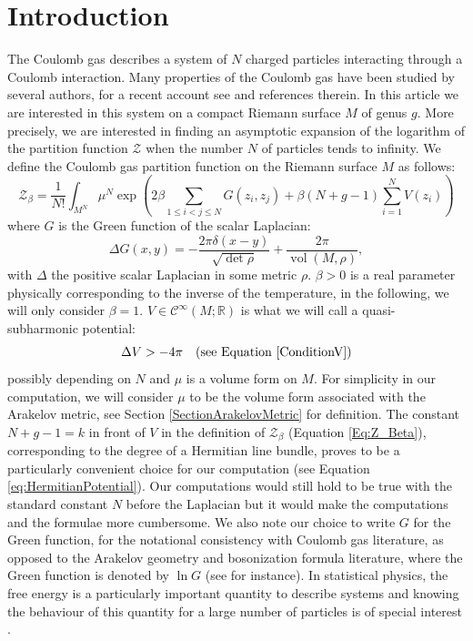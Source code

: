 \documentclass{article}
\theoremstyle{definition}
\theoremstyle{remark}
\DeclareMathOperator{\vol}{vol}
\begin{document}
\section{Introduction}
The Coulomb gas describes a system of $N$ charged particles interacting through a Coulomb interaction. Many properties of the Coulomb gas have been studied by several authors, for a recent account see \cite{serfaty2024lecturescoulombrieszgases,Ginibre} and references therein. In this article we are interested in this system on a compact Riemann surface $M$ of genus $g$. More precisely, we are interested in finding an asymptotic expansion of the logarithm of the partition function $\mathcal{Z}$ when the number $N$ of particles tends to infinity. We define the Coulomb gas partition function on the Riemann surface $M$ as follows: 
\begin{equation}\label{Eq:Z_Beta}
\mathcal{Z}_{\beta}=\frac{1}{N!}\int_{M^{N}}\mu^{N}\exp\left(2\beta\sum_{1\leq i<j\leq N} G(z_{i},z_{j})+\beta(N+g-1)\sum_{i=1}^{N} V(z_{i})\right)
\end{equation}where $G$ is the Green function of the scalar Laplacian: $$\Delta G(x,y)=-\frac{2\pi\delta(x-y)}{\sqrt{\det \rho}}+\frac{2\pi}{\vol(M,\rho)},  $$ with $\Delta$ the positive scalar Laplacian in some metric $\rho.$ $\beta >0$ is a real parameter physically corresponding to the inverse of the temperature, in the following, we will only consider $\beta=1.$ $V \in \mathcal{C}^{\infty}(M;\mathbb{R})$ is what we will call a quasi-subharmonic potential: $$\Delta V>-4\pi  ~~\text{ (see Equation \eqref{ConditionV})}$$ possibly depending on $N$ and $\mu$ is a volume form on $M$. For simplicity in our computation, we will consider $\mu$ to be the volume form associated with the Arakelov metric, see Section \ref{SectionArakelovMetric} for definition. The constant $N+g-1=k$ in front of $V$ in the definition of $\mathcal{Z}_{\beta}$ (Equation \eqref{Eq:Z_Beta}), corresponding to the degree of a Hermitian line bundle, proves to be a particularly convenient choice for our computation (see Equation \eqref{eq:HermitianPotential}). Our computations would still hold to be true with the standard constant $N$ before the Laplacian but it would make the computations and the formulae more cumbersome. We also note our choice to write $G$ for the Green function, for the notational consistency with Coulomb gas  literature, as opposed to the Arakelov geometry and bosonization formula literature, where the Green function is denoted by $\ln G$ (see \cite{ArakelovSJ_1974,WentworthArakelov,WentworthGluing} for instance). In statistical physics, the free energy is a particularly important quantity to describe systems and knowing the behaviour of this quantity for a large number of particles is of special interest \cite{Jancovici1994CoulombSS}. 
\end{document}
